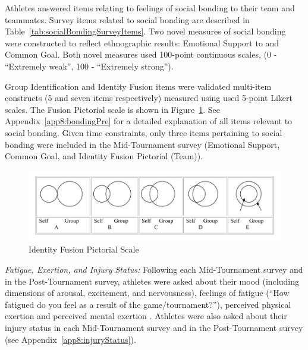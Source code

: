 \begin{CJK}{UTF8}{gbsn}
Athletes answered items relating to feelings of social bonding to their team and teammates.  Survey items related to social bonding are described in Table~\ref{tab:socialBondingSurveyItems}. Two novel measures of social bonding were constructed to reflect ethnographic results: Emotional Support to and Common Goal.  Both novel measures used 100-point continuous scales, (0 - ``Extremely weak'', 100 - ``Extremely strong'').

Group Identification and Identity Fusion items were validated multi-item constructs (5 and seven items respectively) measured using used 5-point Likert scales. The Fusion Pictorial scale is shown in Figure~\ref{fig:fusionPictorialGroup}.  See Appendix~\ref{app8:bondingPre} for a detailed explanation of all items relevant to social bonding.  Given time constraints, only three items pertaining to social bonding were included in the Mid-Tournament survey (Emotional Support, Common Goal, and Identity Fusion Pictorial (Team)).




\begin{figure}[htbp]
  \includegraphics[width=\linewidth]{images/Identity_Fusion_Pictorial_Scale.png}
  \caption{Identity Fusion Pictorial Scale}
  \label{fig:fusionPictorialGroup}
\end{figure}




\textit{Fatigue, Exertion, and Injury Status:} Following each Mid-Tournament survey and in the Post-Tournament survey, athletes were asked about their mood (including dimensions of arousal, excitement, and nervousness), feelings of fatigue (``How fatigued do you feel as a result of the game/tournament?''), perceived physical exertion \citep[Borg RPE scale;][]{Borg1990} and perceived mental exertion \citep[see][]{Noakes2012a}. Athletes were also asked about their injury status in each Mid-Tournament survey and in the Post-Tournament survey (see Appendix~\ref{app8:injuryStatus}).


\end{CJK}
